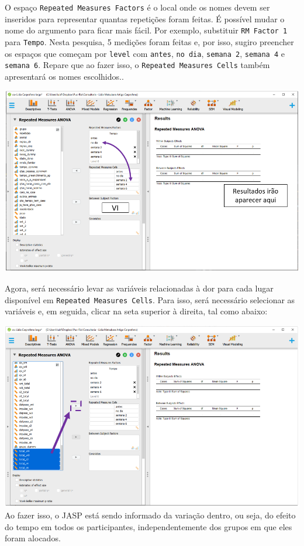 \documentclass[
]{book}
\begin{document}
O espaço \texttt{Repeated\ Measures\ Factors} é o local onde os nomes devem ser inseridos para representar quantas repetições foram feitas. É possível mudar o nome do argumento para ficar mais fácil. Por exemplo, substituir \texttt{RM\ Factor\ 1} para \texttt{Tempo}. Nesta pesquisa, 5 medições foram feitas e, por isso, sugiro preencher os espaços que começam por \texttt{level} com \texttt{antes}, \texttt{no\ dia}, \texttt{semana\ 2}, \texttt{semana\ 4} e \texttt{semana\ 6}. Repare que ao fazer isso, o \texttt{Repeated\ Measures\ Cells} também apresentará os nomes escolhidos..

\includegraphics{./img/cap_anovarm_interface2.png}

Agora, será necessário levar as variáveis relacionadas à dor para cada lugar disponível em \texttt{Repeated\ Measures\ Cells}. Para isso, será necessário selecionar as variáveis e, em seguida, clicar na seta superior à direita, tal como abaixo:

\includegraphics{./img/cap_anovarm_within.png}
Ao fazer isso, o JASP está sendo informado da variação dentro, ou seja, do efeito do tempo em todos os participantes, independentemente dos grupos em que eles foram alocados.
\end{document}
